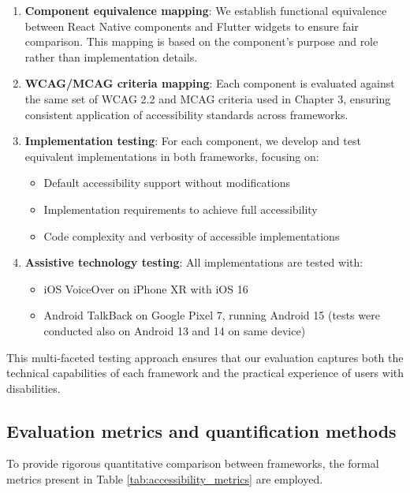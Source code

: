 \begin{enumerate}
    \item \textbf{Component equivalence mapping}: We establish functional equivalence between React Native components and Flutter widgets to ensure fair comparison. This mapping is based on the component's purpose and role rather than implementation details.
    
    \item \textbf{WCAG/MCAG criteria mapping}: Each component is evaluated against the same set of WCAG 2.2 and MCAG criteria used in Chapter 3, ensuring consistent application of accessibility standards across frameworks.
    
    \item \textbf{Implementation testing}: For each component, we develop and test equivalent implementations in both frameworks, focusing on:
    \begin{itemize}
        \item Default accessibility support without modifications
        \item Implementation requirements to achieve full accessibility
        \item Code complexity and verbosity of accessible implementations
    \end{itemize}
    
    \item \textbf{Assistive technology testing}: All implementations are tested with:
    \begin{itemize}
        \item iOS VoiceOver on iPhone XR with iOS 16
        \item Android TalkBack on Google Pixel 7, running Android 15 (tests were conducted also on Android 13 and 14 on same device)
    \end{itemize}
\end{enumerate}

This multi-faceted testing approach ensures that our evaluation captures both the technical capabilities of each framework and the practical experience of users with disabilities.

\subsection{Evaluation metrics and quantification methods}

To provide rigorous quantitative comparison between frameworks, the formal metrics present in Table \ref{tab:accessibility_metrics} are employed.

